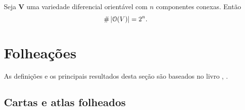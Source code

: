 \begin{proposition}
Seja $\bm V$ uma variedade diferencial orientável com $n$ componentes conexas. Então
	\begin{equation*}
	\#\left\lvert{\mathcal{O}(V)}\right\rvert = 2^n.
	\end{equation*}
\end{proposition}

\section{Folheações}

As definições e os principais resultados desta seção são baseados no livro , \citeauthor{liv:CandelConlon-FoliationsI}.

\subsection{Cartas e atlas folheados}

